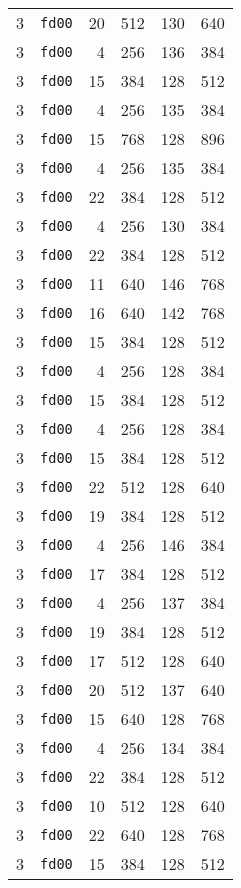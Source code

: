 \documentclass{article}
\begin{document}
\begin{table}[h!]
\begin{tabular}{llrrrl}
    3 & \texttt{fd00} & 20 & 512 & 130 & 640 \\
    3 & \texttt{fd00} & 4 & 256 & 136 & 384 \\
    3 & \texttt{fd00} & 15 & 384 & 128 & 512 \\
    3 & \texttt{fd00} & 4 & 256 & 135 & 384 \\
    3 & \texttt{fd00} & 15 & 768 & 128 & 896 \\
    3 & \texttt{fd00} & 4 & 256 & 135 & 384 \\
    3 & \texttt{fd00} & 22 & 384 & 128 & 512 \\
    3 & \texttt{fd00} & 4 & 256 & 130 & 384 \\
    3 & \texttt{fd00} & 22 & 384 & 128 & 512 \\
    3 & \texttt{fd00} & 11 & 640 & 146 & 768 \\
    3 & \texttt{fd00} & 16 & 640 & 142 & 768 \\
    3 & \texttt{fd00} & 15 & 384 & 128 & 512 \\
    3 & \texttt{fd00} & 4 & 256 & 128 & 384 \\
    3 & \texttt{fd00} & 15 & 384 & 128 & 512 \\
    3 & \texttt{fd00} & 4 & 256 & 128 & 384 \\
    3 & \texttt{fd00} & 15 & 384 & 128 & 512 \\
    3 & \texttt{fd00} & 22 & 512 & 128 & 640 \\
    3 & \texttt{fd00} & 19 & 384 & 128 & 512 \\
    3 & \texttt{fd00} & 4 & 256 & 146 & 384 \\
    3 & \texttt{fd00} & 17 & 384 & 128 & 512 \\
    3 & \texttt{fd00} & 4 & 256 & 137 & 384 \\
    3 & \texttt{fd00} & 19 & 384 & 128 & 512 \\
    3 & \texttt{fd00} & 17 & 512 & 128 & 640 \\
    3 & \texttt{fd00} & 20 & 512 & 137 & 640 \\
    3 & \texttt{fd00} & 15 & 640 & 128 & 768 \\
    3 & \texttt{fd00} & 4 & 256 & 134 & 384 \\
    3 & \texttt{fd00} & 22 & 384 & 128 & 512 \\
    3 & \texttt{fd00} & 10 & 512 & 128 & 640 \\
    3 & \texttt{fd00} & 22 & 640 & 128 & 768 \\
    3 & \texttt{fd00} & 15 & 384 & 128 & 512 \\

\end{tabular}
\end{table}
\end{document}
